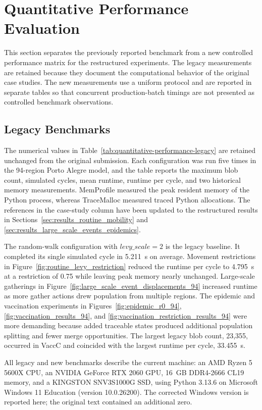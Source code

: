 \section{Quantitative Performance Evaluation}
\label{sec:quantitative_performance}

This section separates the previously reported benchmark from a new controlled
performance matrix for the restructured experiments.  The legacy measurements
are retained because they document the computational behavior of the original
case studies.  The new measurements use a uniform protocol and are reported in
separate tables so that concurrent production-batch timings are not presented as
controlled benchmark observations.

\subsection{Legacy Benchmarks}

The numerical values in Table~\ref{tab:quantitative-performance-legacy} are
retained unchanged from the original submission.  Each configuration was run
five times in the 94-region Porto Alegre model, and the table reports the maximum
blob count, simulated cycles, mean runtime, runtime per cycle, and two historical
memory measurements.  MemProfile measured the peak resident memory of the
Python process, whereas TraceMalloc measured traced Python allocations.  The
references in the case-study column have been updated to the restructured
results in Sections~\ref{sec:results_routine_mobility} and
\ref{sec:results_large_scale_events_epidemics}.

The random-walk configuration with $levy\_scale=2$ is the legacy baseline.  It
completed its single simulated cycle in 5.211~s on average.  Movement
restrictions in Figure~\ref{fig:routine_levy_restriction} reduced the runtime per
cycle to 4.795~s at a restriction of 0.75 while leaving peak memory nearly
unchanged.  Large-scale gatherings in
Figure~\ref{fig:large_scale_event_displacements_94} increased runtime as more
gather actions drew population from multiple regions.  The epidemic and
vaccination experiments in Figures~\ref{fig:epidemic_r0_94},
\ref{fig:vaccination_results_94}, and
\ref{fig:vaccination_restriction_results_94} were more demanding because added
traceable states produced additional population splitting and fewer merge
opportunities.  The largest legacy blob count, 23,355, occurred in VaccC and
coincided with the largest runtime per cycle, 33.455~s.

All legacy and new benchmarks describe the current machine: an AMD Ryzen 5
5600X CPU, an NVIDIA GeForce RTX 2060 GPU, 16~GB DDR4-2666 CL19 memory, and a
KINGSTON SNV3S1000G SSD, using Python 3.13.6 on Microsoft Windows 11 Education
(version 10.0.26200).  The corrected Windows version is reported here; the
original text contained an additional zero.

